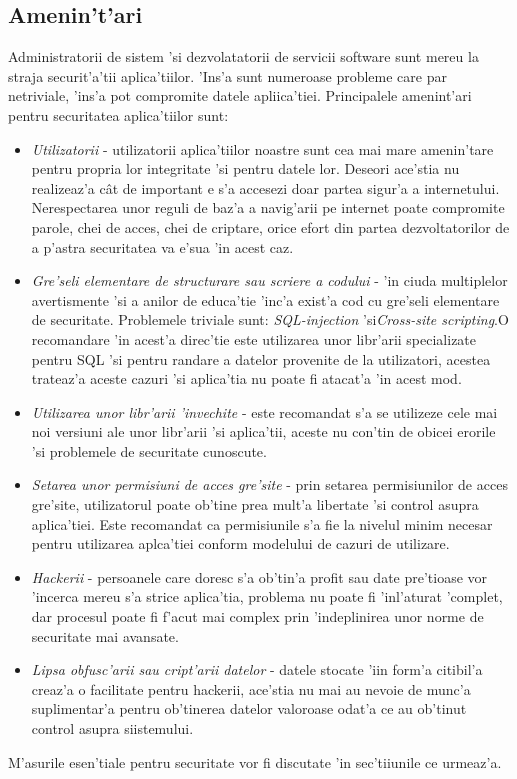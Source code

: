 \documentclass[12pt,a4paper,twoside]{report}
\begin{document}
\subsection{Amenin't'ari}
Administratorii de sistem 'si dezvolatatorii de servicii software sunt mereu la straja securit'a'tii aplica'tiilor. 'Ins'a sunt numeroase probleme care par netriviale, 'ins'a pot compromite datele apliica'tiei. Principalele amenint'ari pentru securitatea aplica'tiilor sunt:
\begin{itemize}
\item \textit{Utilizatorii} - utilizatorii aplica'tiilor noastre sunt cea mai mare amenin'tare pentru propria lor integritate 'si pentru datele lor. Deseori ace'stia nu realizeaz'a cât de important e s'a accesezi doar partea sigur'a a internetului. Nerespectarea unor reguli de baz'a a navig'arii pe internet poate compromite parole, chei de acces, chei de criptare, orice efort din partea dezvoltatorilor de a p'astra securitatea va e'sua 'in acest caz.
\item \textit{Gre'seli elementare de structurare sau scriere a codului} - 'in ciuda multiplelor avertismente 'si a anilor de educa'tie 'inc'a exist'a cod cu gre'seli elementare de securitate. Problemele triviale sunt: \textit{SQL-injection} 'si\textit{Cross-site scripting}.O recomandare 'in acest'a direc'tie este utilizarea unor libr'arii specializate pentru SQL 'si pentru randare a datelor provenite de la utilizatori, acestea trateaz'a aceste cazuri 'si aplica'tia nu poate fi atacat'a 'in acest mod.

\item \textit{Utilizarea unor libr'arii 'invechite} - este recomandat s'a se utilizeze cele mai noi versiuni ale unor libr'arii 'si aplica'tii, aceste nu con'tin de obicei erorile 'si problemele de securitate cunoscute.
\item \textit{Setarea unor permisiuni de acces gre'site} - prin setarea permisiunilor de acces gre'site, utilizatorul poate ob'tine prea mult'a libertate 'si control asupra aplica'tiei. Este recomandat ca permisiunile s'a fie la nivelul minim necesar pentru utilizarea aplca'tiei conform modelului de cazuri de utilizare.
\item \textit{Hackerii} - persoanele care doresc s'a ob'tin'a profit sau date pre'tioase vor 'incerca mereu s'a strice aplica'tia, problema nu poate fi 'inl'aturat 'complet, dar procesul poate fi f'acut mai complex prin 'indeplinirea unor norme de securitate mai avansate.
\item \textit{Lipsa obfusc'arii sau cript'arii datelor} - datele stocate 'iin form'a citibil'a creaz'a o facilitate pentru hackerii, ace'stia nu mai au nevoie de munc'a suplimentar'a pentru ob'tinerea datelor valoroase odat'a ce au ob'tinut control asupra siistemului. 
\end{itemize} 
M'asurile esen'tiale pentru securitate vor fi discutate 'in sec'tiiunile ce urmeaz'a.
\end{document}

